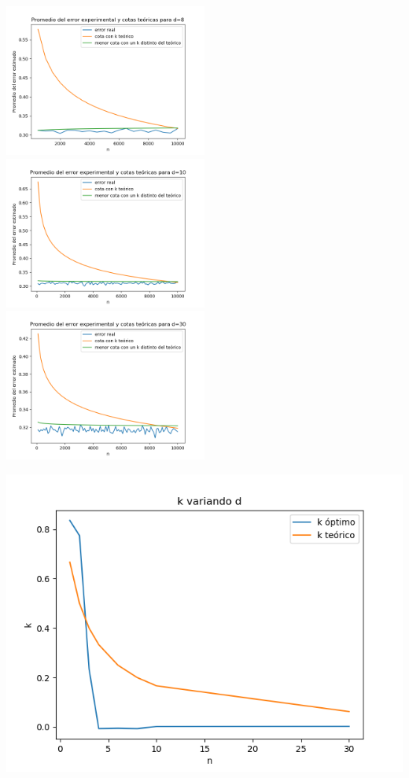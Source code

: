 \documentclass[12pt, a4paper]{article}
\begin{document}
\includegraphics[width=0.5\textwidth]{figuras_h=0.1/cotas-error-d=8}
\includegraphics[width=0.5\textwidth]{figuras_h=0.1/cotas-error-d=10}
\includegraphics[width=0.5\textwidth]{figuras_h=0.1/cotas-error-d=30}

\includegraphics[width=\textwidth]{figuras_h=0.1/k-variando-d}
\end{document}

